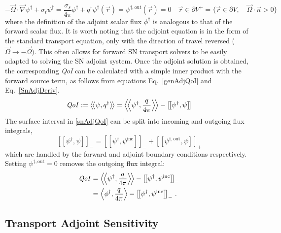 \documentclass[12pt]{report}
\newcommand{\vr}{\vec{r}}
\newcommand{\vO}{\vec{\Omega}}
\newcommand{\bra}{\left\langle}
\newcommand{\ket}{\right\rangle}
\newcommand{\braSN}{\left\langle \! \left\langle}
\newcommand{\ketSN}{\right\rangle \! \right\rangle}
\newcommand{\sbraSN}{\left[ \! \left[}
\newcommand{\sketSN}{\right] \! \right]}
\newcommand{\grad}{\vec{\nabla}}
\newcommand{\bound}{\partial V}
\newcommand{\sigt}{\sigma_t}
\newcommand{\sigs}{\sigma_s}
\newcommand{\angSource}{\frac{q}{4 \pi}}
\newcommand{\scalResp}{q^\dag}
\newcommand{\qoi}{{\it QoI}\xspace}
\begin{document}
\begin{subequations}
\begin{equation}
\label{transAdj}
- \vO \cdot \grad \psi^\dag + \sigt \psi^\dag = \frac{\sigs}{4 \pi} \phi^\dag + \scalResp
\end{equation}
\begin{equation}
\psi^\dag(\vr) = \psi^{\dag, \text{out}}(\vr)=0 \quad \vr \in \partial V^{+} = \{  \vr \in \bound , \quad \vO \cdot \vec{n} > 0 \}
\end{equation}
\end{subequations}
where the definition of the adjoint scalar flux $\phi^\dag$ is analogous to that of 
the forward scalar flux. It is worth noting that the adjoint equation is in the form of the standard transport equation, only with the direction of travel reversed ($\vO \to -\vO)$. This often allows for forward SN transport solvers to be easily adapted to solving the SN adjoint system. Once the adjoint solution is obtained, the corresponding \qoi can be calculated with a simple inner product with the forward source term, as follows from equations Eq.~\eqref{genAdjQoI} and Eq.~\eqref{SnAdjDeriv}. 
\begin{equation}
\label{snAdjQoI}
\qoi := \braSN  \psi,q^\dag \ketSN = \braSN \psi^\dag , \angSource \ketSN - \sbraSN \psi^\dag,  \psi \sketSN
\end{equation}
%
The surface interval in \eqref{snAdjQoI} can be split into incoming and outgoing flux integrals, 
\[
\sbraSN \psi^\dag, \psi \sketSN_- 
= \sbraSN \psi^\dag,  \psi^{\text{inc}} \sketSN_- + \sbraSN \psi^{\dag,\text{out}},\psi \sketSN_+
\]
which are handled by the forward and adjoint boundary conditions respectively. Setting $\psi^{\dag, \text{out}}=0$ removes the outgoing flux integral:
%
\begin{equation}
\label{snAdjQoIBCsplit}
\begin{split}
\qoi &= \braSN \psi^\dag , \angSource \ketSN - \sbraSN \psi^\dag,  \psi^{\text{inc}} \sketSN_- \\
&= \bra \phi^\dag , \angSource \ket - \sbraSN \psi^\dag,  \psi^{\text{inc}} \sketSN_- \,.
\end{split}
\end{equation}

\subsection{Transport Adjoint Sensitivity}
\end{document}
